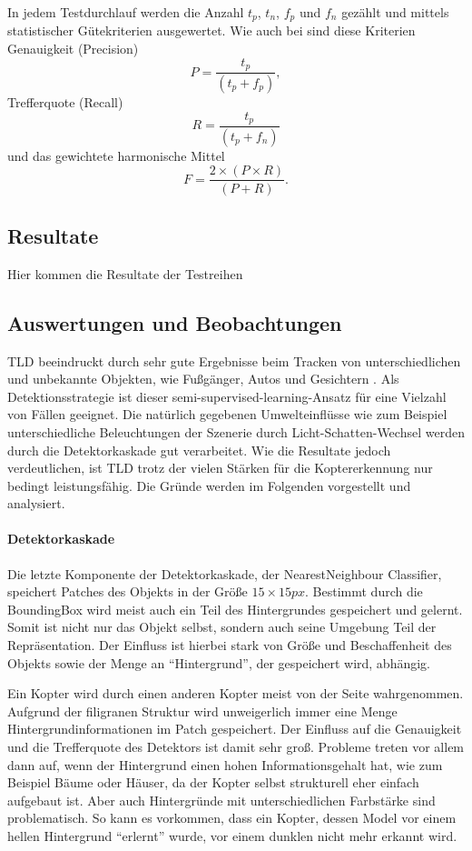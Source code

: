 	In jedem Testdurchlauf werden die Anzahl $t_p$, $t_n$, $f_p$ und $f_n$ gezählt und mittels statistischer Gütekriterien ausgewertet.
  Wie auch bei \cite{TLD} sind diese Kriterien Genauigkeit (Precision) \begin{equation} P=\frac{t_p}{(t_p + f_p)},\end{equation}
  Trefferquote (Recall) \begin{equation} R=\frac{t_p}{(t_p + f_n)} \end{equation}
  und das gewichtete harmonische Mittel \begin{equation} F=\frac{2 \times (P \times R)}{(P + R)}.\end{equation}

\subsection{Resultate}
	Hier kommen die Resultate der Testreihen

\subsection{Auswertungen und Beobachtungen}
	\label{subsec:conclusion}
	TLD beeindruckt durch sehr gute Ergebnisse beim Tracken von unterschiedlichen und unbekannte Objekten, wie Fußgänger, Autos und Gesichtern \cite{TLD}. Als Detektionsstrategie ist dieser semi-supervised-learning-Ansatz für eine Vielzahl von Fällen geeignet. Die natürlich gegebenen Umwelteinflüsse wie zum Beispiel unterschiedliche Beleuchtungen der Szenerie durch Licht-Schatten-Wechsel werden durch die Detektorkaskade gut verarbeitet. Wie die Resultate jedoch verdeutlichen, ist TLD trotz der vielen Stärken für die Koptererkennung nur bedingt leistungsfähig. Die Gründe werden im Folgenden vorgestellt und analysiert.

	\paragraph{Detektorkaskade}
	Die letzte Komponente der Detektorkaskade, der NearestNeighbour Classifier, speichert Patches des Objekts in der Größe $15\times15 px$. Bestimmt durch die BoundingBox wird meist auch ein Teil des Hintergrundes gespeichert und gelernt. Somit ist nicht nur das Objekt selbst, sondern auch seine Umgebung Teil der Repräsentation. Der Einfluss ist hierbei stark von Größe und Beschaffenheit des Objekts sowie der Menge an ``Hintergrund'', der gespeichert wird, abhängig.

	Ein Kopter wird durch einen anderen Kopter meist von der Seite wahrgenommen. Aufgrund der filigranen Struktur wird unweigerlich immer eine Menge Hintergrundinformationen im Patch gespeichert. Der Einfluss auf die Genauigkeit und die Trefferquote des Detektors ist damit sehr groß. Probleme treten vor allem dann auf, wenn der Hintergrund einen hohen Informationsgehalt hat, wie zum Beispiel Bäume oder Häuser, da der Kopter selbst strukturell eher einfach aufgebaut ist. Aber auch Hintergründe mit unterschiedlichen Farbstärke sind problematisch. So kann es vorkommen, dass ein Kopter, dessen Model vor einem hellen Hintergrund ``erlernt'' wurde, vor einem dunklen nicht mehr erkannt wird.


